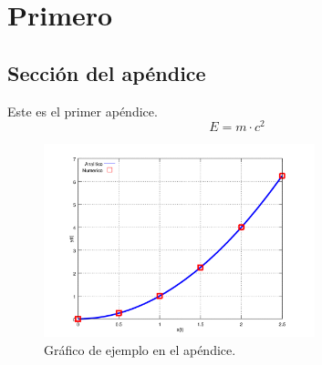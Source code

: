 \chapter{Primero} \label{Ape1}

\section{Sección del apéndice}
Este es el primer apéndice.
\begin{equation}
	E = m\cdot c^2
\end{equation}

\begin{figure}[h]
	\centering
	\includegraphics[width=0.7\textwidth]{Figuras/apendice_A/x_vs_y}
	\caption{Gráfico de ejemplo en el apéndice.}
	\label{fig:plot2}
\end{figure}